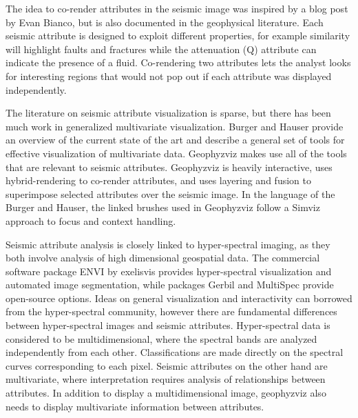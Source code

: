 \documentclass[journal]{vgtc}                %
\begin{document}
The idea to co-render attributes in the seismic image was inspired by a blog post by Evan Bianco, but is
also documented in the geophysical literature. Each seismic attribute is designed to exploit different
properties, for example similarity will highlight faults and fractures while the attenuation (Q) attribute
can indicate the presence of a fluid. Co-rendering two attributes lets the analyst looks for interesting
regions that would not pop out if each attribute was displayed independently.

The literature on seismic attribute visualization is sparse, but there has been much work in
generalized multivariate visualization. Burger and Hauser provide an overview of the current
state of the art and describe a general set of tools for effective visualization of multivariate data.
Geophyzviz makes use all of the tools that are relevant to seismic attributes. Geophyzviz is
heavily interactive, uses hybrid-rendering to co-render attributes, and uses layering and fusion
to superimpose selected attributes over the seismic image. In the language of the Burger and Hauser,
the linked brushes used in Geophyzviz follow a Simviz approach to focus and context handling.

Seismic attribute analysis is closely linked to hyper-spectral imaging, as they both involve
analysis of high dimensional geospatial data. The commercial software package ENVI by
exelisvis provides hyper-spectral visualization and automated image segmentation, while
packages Gerbil and MultiSpec provide open-source options. Ideas on general visualization
and interactivity can borrowed from the hyper-spectral community, however there are fundamental
differences between hyper-spectral images and seismic attributes. Hyper-spectral data is considered
to be multidimensional, where the spectral bands are analyzed independently from each other.
Classifications are made directly on the spectral curves corresponding to each pixel. Seismic
attributes on the other hand are multivariate, where interpretation requires analysis of
relationships between attributes. In addition to display a multidimensional image, geophyzviz
also needs to display multivariate information between attributes.
\end{document}
